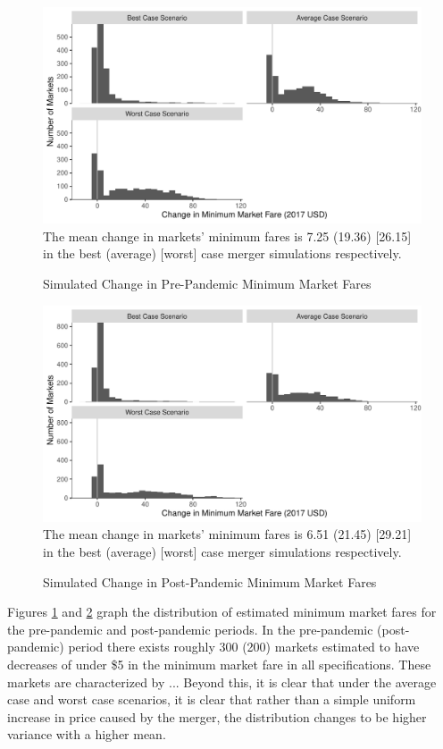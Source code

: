 \documentclass{article}
\begin{document}
    
    \begin{figure}
    \caption{Simulated Change in Pre-Pandemic Minimum Market Fares}
    \includegraphics[width = \linewidth]{PrePandemic_Merger_Change_MinimumFare_Dist}
    \label{fig:PrePan_MinimumFare_Dist}
    The mean change in markets' minimum fares is 7.25 (19.36) [26.15] in the best (average) [worst] case merger simulations respectively.  
    \end{figure}    

    \begin{figure}
    \caption{Simulated Change in Post-Pandemic Minimum Market Fares}
    \includegraphics[width = \linewidth]{Merger_Change_MinimumFare_Dist}
    \label{fig:PostPan_MinimumFare_Dist}
    The mean change in markets' minimum fares is 6.51 (21.45) [29.21] in the best (average) [worst] case merger simulations respectively.  
    \end{figure}    

    Figures \ref{fig:PrePan_MinimumFare_Dist} and \ref{fig:PostPan_MinimumFare_Dist} graph the distribution of estimated minimum market fares for the pre-pandemic and post-pandemic periods. In the pre-pandemic (post-pandemic) period there exists roughly 300 (200) markets estimated to have decreases of under \$5 in the minimum market fare in all specifications. These markets are characterized by ... Beyond this, it is clear that under the average case and worst case scenarios, it is clear that rather than a simple uniform increase in price caused by the merger, the distribution changes to be higher variance with a higher mean.  
\end{document}

